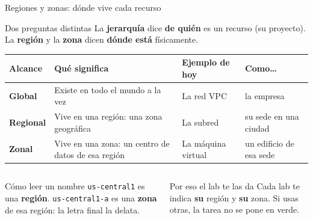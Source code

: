 \documentclass[aspectratio=169,10pt,c]{beamer}
\begin{document}
\begin{frame}{Regiones y zonas: dónde vive cada recurso}
\begin{block}{Dos preguntas distintas}
\small La \textbf{jerarquía} dice \textbf{de quién} es un recurso (su proyecto). La \textbf{región} y la \textbf{zona} dicen \textbf{dónde está} físicamente.
\end{block}
\renewcommand{\arraystretch}{1.3}
\centering\small
\begin{tabular}{@{}p{2.2cm}>{\raggedright\arraybackslash}p{4.8cm}p{2.7cm}>{\raggedright\arraybackslash}p{2.8cm}@{}}
\toprule
\textbf{Alcance} & \textbf{Qué significa} & \textbf{Ejemplo de hoy} & \textbf{Como\ldots}\\
\midrule
\textbf{Global} & Existe en todo el mundo a la vez & La red VPC & la empresa\\
\textbf{Regional} & Vive en una región: una zona geográfica & La subred & su sede en una ciudad\\
\textbf{Zonal} & Vive en una zona: un centro de datos de esa región & La máquina virtual & un edificio de esa sede\\
\bottomrule
\end{tabular}
\par\vspace{2mm}
\begin{columns}[T,onlytextwidth]
\begin{exampleblock}{Cómo leer un nombre}
\small \texttt{us-central1} es una \textbf{región}. \texttt{us-central1-a} es una \textbf{zona} de esa región: la letra final la delata.
\end{exampleblock}
\begin{alertblock}{Por eso el lab te las da}
\small Cada lab te indica \textbf{su} región y \textbf{su} zona. Si usas otras, la tarea no se pone en verde.
\end{alertblock}
\end{columns}
\end{frame}
\end{document}
